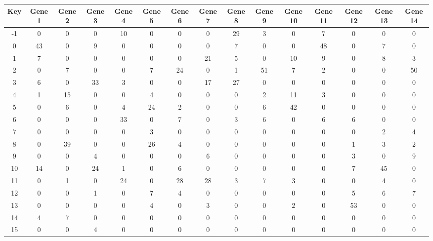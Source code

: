 \begin{tabular}{|c|c|c|c|c|c|c|c|c|c|c|c|c|c|c|}
\hline
Key & Gene 1 & Gene 2 & Gene 3 & Gene 4 & Gene 5 & Gene 6 & Gene 7 & Gene 8 & Gene 9 & Gene 10 & Gene 11 & Gene 12 & Gene 13 & Gene 14 \\
\hline
-1 & 0 & 0 & 0 & 10 & 0 & 0 & 0 & 29 & 3 & 0 & 7 & 0 & 0 & 0 \\
0 & 43 & 0 & 9 & 0 & 0 & 0 & 0 & 7 & 0 & 0 & 48 & 0 & 7 & 0 \\
1 & 7 & 0 & 0 & 0 & 0 & 0 & 21 & 5 & 0 & 10 & 9 & 0 & 8 & 3 \\
2 & 0 & 7 & 0 & 0 & 7 & 24 & 0 & 1 & 51 & 7 & 2 & 0 & 0 & 50 \\
3 & 6 & 0 & 33 & 3 & 0 & 0 & 17 & 27 & 0 & 0 & 0 & 0 & 0 & 0 \\
4 & 1 & 15 & 0 & 0 & 4 & 0 & 0 & 0 & 2 & 11 & 3 & 0 & 0 & 0 \\
5 & 0 & 6 & 0 & 4 & 24 & 2 & 0 & 0 & 6 & 42 & 0 & 0 & 0 & 0 \\
6 & 0 & 0 & 0 & 33 & 0 & 7 & 0 & 3 & 6 & 0 & 6 & 6 & 0 & 0 \\
7 & 0 & 0 & 0 & 0 & 3 & 0 & 0 & 0 & 0 & 0 & 0 & 0 & 2 & 4 \\
8 & 0 & 39 & 0 & 0 & 26 & 4 & 0 & 0 & 0 & 0 & 0 & 1 & 3 & 2 \\
9 & 0 & 0 & 4 & 0 & 0 & 0 & 6 & 0 & 0 & 0 & 0 & 3 & 0 & 9 \\
10 & 14 & 0 & 24 & 1 & 0 & 6 & 0 & 0 & 0 & 0 & 0 & 7 & 45 & 0 \\
11 & 0 & 1 & 0 & 24 & 0 & 28 & 28 & 3 & 7 & 3 & 0 & 0 & 4 & 0 \\
12 & 0 & 0 & 1 & 0 & 7 & 4 & 0 & 0 & 0 & 0 & 0 & 5 & 6 & 7 \\
13 & 0 & 0 & 0 & 0 & 4 & 0 & 3 & 0 & 0 & 2 & 0 & 53 & 0 & 0 \\
14 & 4 & 7 & 0 & 0 & 0 & 0 & 0 & 0 & 0 & 0 & 0 & 0 & 0 & 0 \\
15 & 0 & 0 & 4 & 0 & 0 & 0 & 0 & 0 & 0 & 0 & 0 & 0 & 0 & 0 \\
\hline
\end{tabular}